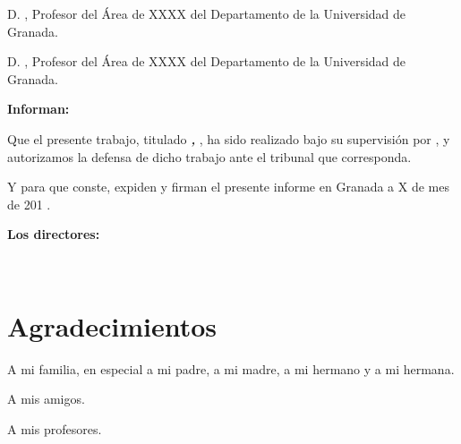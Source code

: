D. \textbf\myProf, Profesor del Área de XXXX del Departamento \myDepartment de la Universidad de Granada.

\vspace{0.5cm}

D. \textbf\myOtherProf, Profesor del Área de XXXX del Departamento \myDepartment de la Universidad de Granada.


\vspace{0.5cm}

\textbf{Informan:}

\vspace{0.5cm}

Que el presente trabajo, titulado \textit{\textbf{\myTitle, \mySubTitle}},
ha sido realizado bajo su supervisión por \textbf{\myName}, y autorizamos la defensa de dicho trabajo ante el tribunal
que corresponda.

\vspace{0.5cm}

Y para que conste, expiden y firman el presente informe en Granada a X de mes de 201 .

\vspace{1cm}

\textbf{Los directores:}

\vspace{5cm}

\noindent \textbf{\myProf \ \ \ \ \ \myOtherProf}

\chapter*{Agradecimientos}
\thispagestyle{empty}

       \vspace{1cm}


A mi familia, en especial a mi padre, a mi madre, a mi hermano y a mi hermana. 

A mis amigos.

A mis profesores.

